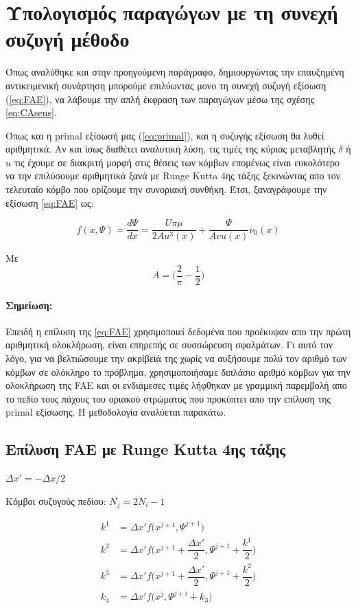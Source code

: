 \section{Υπολογισμός παραγώγων με τη συνεχή συζυγή μέθοδο} 

Όπως αναλύθηκε και στην προηγούμενη παράγραφο, δημιουργώντας την επαυξημένη αντικειμενική συνάρτηση μπορούμε επιλύωντας μονο τη συνεχή συζυγή εξίσωση (\ref{eq:FAE}), να λάβουμε την απλή έκφραση των παραγώγων μέσω της σχέσης \ref{eq:CAsens}. 

Όπως και η primal εξίσωσή μας (\ref{eq:primal}), και η συζυγής εξίσωση θα λυθεί αριθμητικά. Αν και ίσως διαθέτει αναλυτική λύση, τις τιμές της κύριας μεταβλητής $\delta$ ή $u$ τις έχουμε σε διακριτή μορφή στις θέσεις των κόμβων επομένως είναι ευκολότερο να την επιλύσουμε αριθμητικά ξανά με Runge Kutta 4ης τάξης ξεκινώντας απο τον τελευταίο κόμβο που ορίζουμε την συνοριακή συνθήκη. Έτσι, ξαναγράφουμε την εξίσωση \ref{eq:FAE} ως:

\begin{equation}
f(x,\Psi) = \dfrac{d\Psi}{dx} =  \dfrac{U\pi\mu}{2Au^3(x)} +  \dfrac{\Psi}{Avu(x)}\nu_0(x) 
    \label{eq:transFAE}
\end{equation}

Με $$A = \Big(\dfrac{2}{\pi} - \dfrac{1}{2}\Big)$$

\paragraph{Σημείωση:} Επειδή η επίλυση της \ref{eq:FAE} χρησιμοποιεί δεδομένα που προέκυψαν απο την πρώτη αριθμητική ολοκλήρωση, είναι επηρεπής σε συσσώρευση σφαλμάτων. Γι αυτό τον λόγο, για να βελτιώσουμε την ακρίβειά της χωρίς να αυξήσουμε πολύ τον αριθμό των κόμβων σε ολόκληρο το πρόβλημα, χρησιμοποιήσαμε διπλάσιο αριθμό κόμβων για την ολοκλήρωση της FAE και οι ενδιάμεσες τιμές λήφθηκαν με γραμμική παρεμβολή απο το πεδίο τους πάχους του οριακού στρώματος που προκύπτει απο την επίλυση της primal εξίσωσης. Η μεθοδολογία αναλύεται παρακάτω.  

\subsection{Επίλυση FAE με Runge Kutta 4ης τάξης}

$\Delta x' = -\Delta x / 2$

Κόμβοι συζυγούς πεδίου: $N_j = 2N_i - 1$


\begin{align*}
    k^1 &= \Delta x'f\Big(x^{j+1},\Psi^{j+1}\Big)\\[10pt]
    k^2 &= \Delta x'f\Big(x^{j+1} + \dfrac{\Delta x'}{2}, \Psi^{j+1} + \dfrac{k^1}{2}\Big)\\[10pt]
    k^3 &= \Delta x'f\Big(x^{j+1} + \dfrac{\Delta x'}{2}, \Psi^{j+1} + \dfrac{k^2}{2}\Big)\\[10pt]
    k_4 &= \Delta x'f\Big(x^j,\Psi^{j+i} + k_3\Big)
\end{align*}

